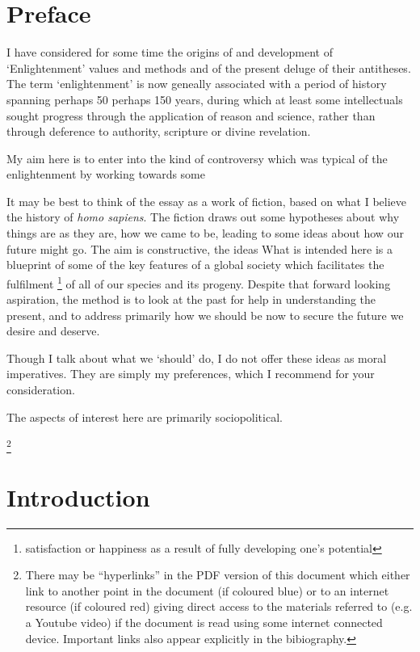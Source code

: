 \documentclass[10pt,titlepage]{book}
\begin{document}
\section*{Preface}

I have considered for some time the origins of and development of `Enlightenment' values and methods and of the present deluge of their antitheses.
The term `enlightenment' is now geneally associated with a period of history spanning perhaps 50 perhaps 150 years, during which at least some intellectuals sought progress through the application of reason and science, rather than through deference to authority, scripture or divine revelation.

My aim here is to enter into the kind of controversy which was typical of the enlightenment by working towards some 

It may be best to think of the essay as a work of fiction, based on what I believe the history of \emph{homo sapiens}.
The fiction draws out some hypotheses about why things are as they are, how we came to be, leading to some ideas about how our future might go.
The aim is constructive, the ideas
What is intended here is a blueprint of some of the key features of a global society which facilitates the fulfilment%
\footnote{satisfaction or happiness as a result of fully developing one's potential}
of all of our species and its progeny.
Despite that forward looking aspiration, the method is to look at the past for help in understanding the present, and to address primarily how we should be now to secure the future we desire and deserve.

Though I talk about what we `should' do, I do not offer these ideas as moral imperatives.
They are simply my preferences, which I recommend for your consideration.


The aspects of interest here are primarily sociopolitical.


\footnote{There may be ``hyperlinks'' in the PDF version of this document which either link to another point in the document  (if coloured blue) or to an internet resource  (if coloured red) giving direct access to the materials referred to (e.g. a Youtube video) if the document is read using some internet connected device.
Important links also appear explicitly in the bibiography.}

\pagebreak
\section{Introduction}
\end{document}
